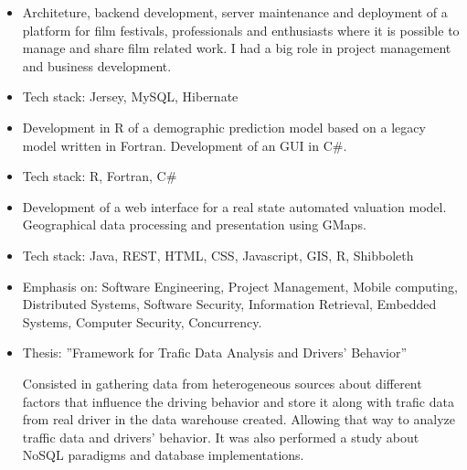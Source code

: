\documentclass[10pt,a4paper]{altacv}
\begin{document}
\divider

\begin{itemize}
\justifying
\item Architeture, backend development, server maintenance and deployment of a
  platform for film festivals, professionals and enthusiasts where it is
  possible to manage and share film related work. I had a big role in project
  management and business development.
\item Tech stack: Jersey, MySQL, Hibernate
\end{itemize}

\divider

\begin{itemize}
\justifying
\item Development in R of a demographic prediction model based on a legacy model 
written in Fortran. Development of an GUI in C#.
\item Tech stack: R, Fortran, C#
\end{itemize}

\newpage 

\begin{itemize}
\justifying
\item Development of a web interface for a real state automated valuation model.
Geographical data processing and presentation using GMaps.
\item Tech stack: Java, REST, HTML, CSS, Javascript, GIS, R, Shibboleth
\end{itemize}

 
\begin{itemize}
\justifying
\item Emphasis on: Software Engineering, Project Management, Mobile computing, Distributed Systems, Software Security, Information Retrieval, Embedded Systems, Computer Security, Concurrency.
\item Thesis: ''Framework for Trafic Data Analysis and Drivers’ Behavior''
  
Consisted in gathering data from heterogeneous sources about different factors
that influence the driving behavior and store it along with trafic data from real
driver in the data warehouse created. Allowing that way to analyze traffic data
and drivers’ behavior. It was also performed a study about NoSQL paradigms and
database implementations.
\end{itemize}
\divider
\end{document}
